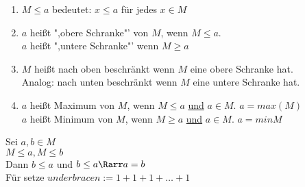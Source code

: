 	\begin{enumerate}
	\item{$M \leq a$ bedeutet: $x \leq a$ für jedes $x \in M$}
	\item{$a$ heißt ",obere Schranke"' von $M$, wenn $M \leq a$.\\
		$a$ heißt ",untere Schranke"' wenn $M \geq a$}
	\item{$M$ heißt nach oben beschränkt wenn $M$ eine obere Schranke hat.\\
	Analog: nach unten beschränkt wenn $M$ eine untere Schranke hat.}
	\item{$a$ heißt Maximum von $M$, wenn $M \leq a$ \underline{und} $a \in M$. $a = max(M)$\\
		$a$ heißt Minimum von $M$, wenn $M \geq a$ \underline{und} $a \in M$. $a = min{M}$}
	\end{enumerate}
\bew
	Sei $a, b \in M$\\
	$M \leq a, M \leq b$\\
	Dann $b \leq a$ und $b \leq a \Rarr a = b$\\
	Für \nN{} setze $underbrace{n:= 1 + 1 + 1 + … + 1}$
	